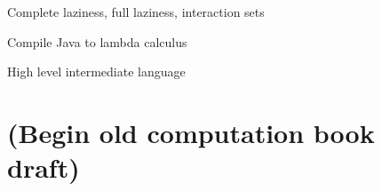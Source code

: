 Complete laziness, full laziness, interaction sets

Compile Java to lambda calculus

High level intermediate language


\section{(Begin old computation book draft)}

\theoremstyle{definition}
\newtheorem{mdef}[thmctr]{Definition}
\newtheorem{mque}[thmctr]{Question}
\newtheorem{mcon}[thmctr]{Conjecture}
\newtheorem{msco}[thmctr]{Strong Conjecture}
\newtheorem{mcor}[thmctr]{Corollary}
\newtheorem{mlem}[thmctr]{Lemma}
\newtheorem{mthm}[thmctr]{Theorem}
\newcommand\sno{\ensuremath{\mathcal N}}
\newcommand\syes{\ensuremath{\mathcal Y}}
\newcommand\Fin{\ensuremath{\operatorname{Fin}}}
\newcommand\powerset{\ensuremath{\mathcal{P}}}
\newcommand\fa[1]{\forall#1\,}
\newcommand\Fa[1]{\forall#1~}
\newcommand\FA[1]{\forall#1~~}
\newcommand\sfT{\mathsf{T}}
\newcommand\Typ{\mathsf{Typ}}
\newcommand\Either[2]{\mathsf{Either}~#1~#2}
\newcommand\Left[1]{\mathsf{Left}~#1}
\newcommand\Right[1]{\mathsf{Right}~#1}
\newcommand\Void{\mathsf{Void}}
\newcommand\Pair[2]{\mathsf{Pair}~#1~#2}
\newcommand\UDMach[1]{\mathsf{UDMach}~#1}
\newcommand\DMach[1]{\mathsf{DMach}~#1}
\newcommand\NMach[1]{\mathsf{NMach}~#1}
\newcommand\Mach[2]{\mathsf{Mach}~#1~#2}
\newcommand\Macha[1]{\mathsf{Mach}~#1}
\newcommand\RecRel{\mathsf{RecRel}}
\newcommand\Kleene[1]{\mathsf{Kleene}~#1}
\newcommand\RecFun{\mathsf{RecFun}}
\newcommand\DTM{\mathsf{DTM}}
\newcommand\NTM{\mathsf{NTM}}
\newcommand\sfDMach{\mathsf{DMach}}
\newcommand\sfNMach{\mathsf{NMach}}
\newcommand\sfFun{\mathsf{Fun}}
\newcommand\sfSet{\mathsf{Set}}
\newcommand\sfRel{\mathsf{Rel}}
\newcommand\sfVec{\mathsf{Vec}}
\newcommand\Vect[2]{\sfVec~#1~#2}
\newcommand\Relab[2]{\sfRel~#1~#2}
\newcommand\Fun[2]{\sfFun~#1~#2}
\newcommand\sfPred{\mathsf{Pred}}
\newcommand\Pred[1]{\sfPred~#1}
\newcommand\setB{\mathbb B}
\newcommand\decset{\mathcal D}
\newcommand\langset{\mathcal L}
\newcommand\TC{\mathcal{T}}
\newcommand\leTC{\ensuremath{\le_\TC}}
\newcommand\Teq{\mathbb{T}}
\newcommand\Teqsum{\mathbf{T}}
\newcommand\Seq{\mathbb{S}}
\newcommand\Seqsum{\mathbf{S}}
\newcommand\SC{\mathcal{S}}
\newcommand\fite[3]{\text{if}~#1~\text{then}~#2~\text{else}~#3}
\newcommand\id{\ensuremath{\operatorname{id}}}
\newcommand\mE{\ensuremath{\mathcal E}}
